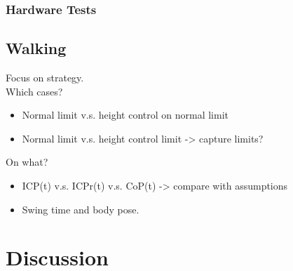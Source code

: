 \subsubsection{Hardware Tests}
\subsection{Walking}
Focus on strategy.\\
Which cases? 
\begin{itemize}
	\item Normal limit v.s. height control on normal limit
	\item Normal limit v.s. height control limit -> capture limits?
\end{itemize}

On what?
\begin{itemize}
	\item ICP(t) v.s. ICPr(t) v.s. CoP(t) -> compare with assumptions
	\item Swing time and body pose.
\end{itemize}


\section{Discussion}
